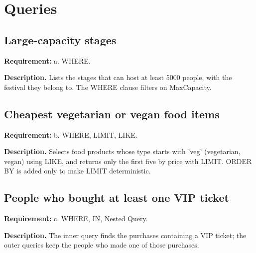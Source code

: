 \chapter{Queries}

\section{Large-capacity stages}
\textbf{Requirement:} a. WHERE.

\textbf{Description.} Lists the stages that can host at least 5000 people, with the festival they belong to. The WHERE clause filters on MaxCapacity. 



\section{Cheapest vegetarian or vegan food items}
\textbf{Requirement:} b. WHERE, LIMIT, LIKE.

\textbf{Description.} Selects food products whose type starts with 'veg' (vegetarian, vegan) using LIKE, and returns only the first five by price with LIMIT. ORDER BY is added only to make LIMIT deterministic. 



\section{People who bought at least one VIP ticket}
\textbf{Requirement:} c. WHERE, IN, Nested Query.

\textbf{Description.} The inner query finds the purchases containing a VIP ticket; the outer queries keep the people who made one of those purchases. 



